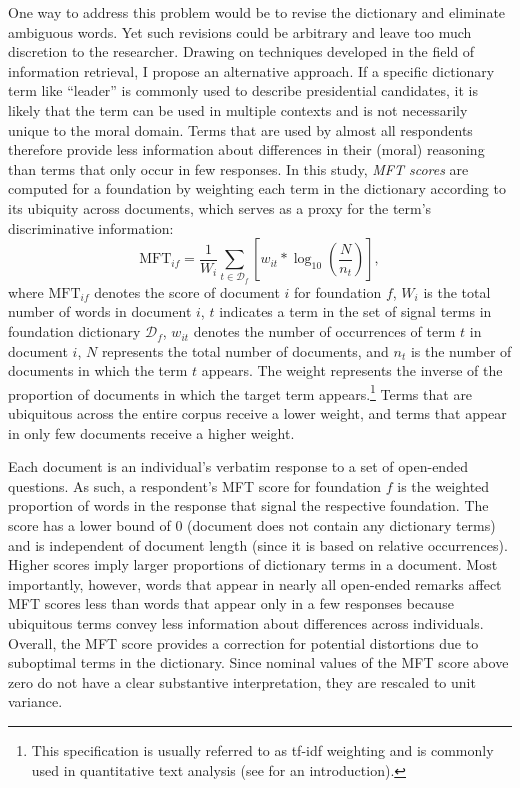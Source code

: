 \documentclass[12pt]{article}
\begin{document}
One way to address this problem would be to revise the dictionary and eliminate ambiguous words. Yet such revisions could be arbitrary and leave too much discretion to the researcher. Drawing on techniques developed in the field of information retrieval, I propose an alternative approach. If a specific dictionary term like ``leader'' is commonly used to describe presidential candidates, it is likely that the term can be used in multiple contexts and is not necessarily unique to the moral domain. Terms that are used by almost all respondents therefore provide less information about differences in their (moral) reasoning than terms that only occur in few responses. In this study, \textit{MFT scores} are computed for a foundation by weighting each term in the dictionary according to its ubiquity across documents, which serves as a proxy for the term's discriminative information:
\begin{equation}\label{eq:tfidf}
\text{MFT}_{if} = \dfrac{1}{W_i} \sum_{t \in \mathcal{D}_f} \left[ w_{it} * \log_{10}\left( \dfrac{N}{n_t}\right) \right],
\end{equation}
where $\text{MFT}_{if}$ denotes the score of document $i$ for foundation $f$, $W_i$ is the total number of words in document $i$, $t$ indicates a term in the set of signal terms in foundation dictionary $\mathcal{D}_f$, $w_{it}$ denotes the number of occurrences of term $t$ in document $i$, $N$ represents the total number of documents, and $n_t$ is the number of documents in which the term $t$ appears. The weight represents the inverse of the proportion of documents in which the target term appears.\footnote{This specification is usually referred to as tf-idf weighting and is commonly used in quantitative text analysis (see \citealt[ch. 6]{manning2008introduction} for an introduction).} Terms that are ubiquitous across the entire corpus receive a lower weight, and terms that appear in only few documents receive a higher weight. %

Each document is an individual's verbatim response to a set of open-ended questions. As such, a respondent's MFT score for foundation $f$ is the weighted proportion of words in the response that signal the respective foundation. The score has a lower bound of 0 (document does not contain any dictionary terms) and is independent of document length (since it is based on relative occurrences). Higher scores imply larger proportions of dictionary terms in a document. Most importantly, however, words that appear in nearly all open-ended remarks affect MFT scores less than words that appear only in a few responses because ubiquitous terms convey less information about differences across individuals. Overall, the MFT score provides a correction for potential distortions due to suboptimal terms in the dictionary. Since nominal values of the MFT score above zero do not have a clear substantive interpretation, they are rescaled to unit variance.
\end{document}
